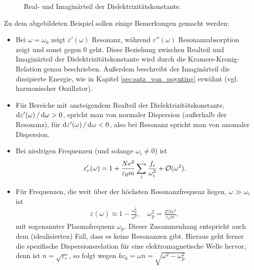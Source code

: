 \begin{figure}[htb]
    \centering
    \tfigDielectricConstantRealPart
    \tfigDielectricConstantImaginaryPart
    \caption{Real- und Imaginärteil der Dielektrizitätskonstante. }
    \label{fig:dielectric_constant_real_and_imaginary_one_resonance}
\end{figure}

Zu dem abgebildeten Beispiel sollen einige Bemerkungen gemacht werden:
\begin{itemize}
    \item Bei $\omega=\omega_0$ zeigt $\varepsilon'(\omega)$ Resonanz, während $\varepsilon''(\omega)$ Resonanzabsorption zeigt und sonst gegen $0$ geht. Diese Beziehung zwischen Realteil und Imaginärteil der Dielektrizitätskonstante wird durch die Kramers-Kronig-Relation genau beschrieben. Außerdem beschreibt der Imaginärteil die dissipierte Energie, wie in Kapitel \ref{sec:satz_von_poynting} erwähnt (vgl. harmonischer Oszillator).
    \item Für Bereiche mit ansteigendem Realteil der Dielektrizitätskonstante, $\mathop{\mathrm{d}^{}\varepsilon'(\omega)}/\mathop{\mathrm{d}^{}\omega}>0$, spricht man von normaler Dispersion (außerhalb der Resonanz), für $\mathop{\mathrm{d}^{}\varepsilon'(\omega)}/\mathop{\mathrm{d}^{}\omega}<0$, also bei Resonanz spricht man von anomaler Dispersion.
    \item Bei niedrigen Frequenzen (und solange $\omega_i\neq 0$) ist
          \begin{align*}
              \varepsilon_r'(\omega) = 1+ \frac{Ne^2}{\varepsilon_0 m} \sum_i \frac{f_i}{\omega_i^2} + \mathcal{O}(\omega^2).
          \end{align*}
    \item Für Frequenzen, die weit über der höchsten Resonanzfrequenz liegen, $\omega\gg\omega_i$ ist
          \begin{align}
              \label{eq:dielectric_constant_high_freqs}
              \varepsilon(\omega)\approx 1 - \frac{\omega_\mathrm{p}^2}{\omega^2}, \quad \omega_\mathrm{p}^2=\frac{ZNe^2}{\varepsilon_0m},
          \end{align}
          mit sogenannter Plasmafrequenz $\omega_\mathrm{p}$.
          Dieser Zusammenhang entspricht auch dem (idealisierten) Fall, dass es keine Resonanzen gibt.
          Hieraus geht ferner die spezifische Dispersionsrelation für eine elektromagnetische Welle hervor, denn
          ist $\overline{n}=\sqrt{\varepsilon_r}$, so folgt wegen $kc_0=\omega\overline{n}=\sqrt{\omega^2-\omega_\mathrm{p}^2}$
          \begin{align*}

\end{align*}
\end{itemize}
